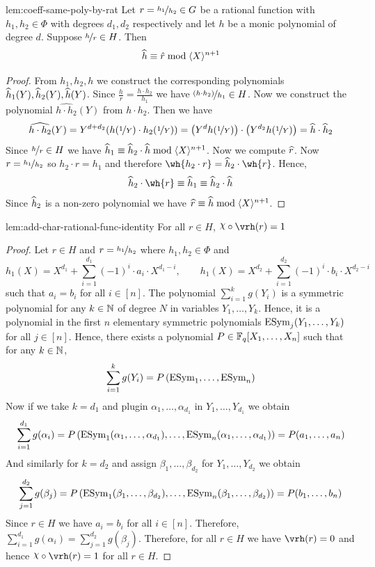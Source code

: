 \begin{lemma}{}{lem:coeff-same-poly-by-rat}
Let $r =\nicefrac{h_1}{h_2}\in G$ be a rational function with $h_1,h_2\in\Phi$ with degrees $d_1, d_2$ respectively and let $h$ be a monic polynomial of degree $d$.
Suppose $\nicefrac{h}{r}\in H$. Then
\[
\widehat{h} \equiv \hat{r} \bmod{\langle X\rangle^{n+1}}
\]
\end{lemma}
\begin{proof}
  From $h_1,h_2,h$ we construct the corresponding polynomials $\widehat{h}_1(Y),\widehat{h}_2(Y), \widehat{h}(Y)$. Since $\frac{h}{r}=\frac{h\cdot h_2}{h_1}$ we have $\nicefrac{(h\cdot h_2)}{h_1}\in H$. Now we construct the polynomial $\widehat{h\cdot h_2}(Y)$ from $h\cdot h_2$. Then we have $$\widehat{h\cdot h_2}(Y)=Y^{d+d_2}(h(\nicefrac1Y)\cdot h_2(\nicefrac1Y))=\left(Y^dh(\nicefrac1Y)\right)\cdot \left(Y^{d_2}h(\nicefrac1Y)\right)=\widehat{h}\cdot \widehat{h}_2$$Since $\nicefrac{h}{r}\in H$ we have $\widehat{h}_1\equiv \widehat{h}_2\cdot \widehat{h}\bmod{\langle X\rangle^{n+1}}$. 
  Now we compute $\widehat{r}$. Now $r=\nicefrac{h_1}{h_2}$ so $h_2\cdot r=h_1$ and therefore $\wh{h_2\cdot r}=\hh_2\cdot \wh{r}$. Hence, $$\hh_2\cdot \wh{r}\equiv \hh_1\equiv \hh_2\cdot \hh$$ Since $\widehat{h}_2$ is a non-zero polynomial we have $\widehat{r}\equiv \widehat{h}\bmod{\langle X\rangle^{n+1}}$. 
\end{proof}

\begin{lemma}{}{lem:add-char-rational-func-identity}
  For all $r\in H$, $\chi\circ\vrh(r)=1$
\end{lemma}
\begin{proof}
  Let $r\in H$ and $r=\nicefrac{h_1}{h_2}$ where $h_1,h_2\in\Phi$ and  $$h_1(X)=X^{d_1}+\sum_{i=1}^{d_1}(-1)^i\cdot a_i\cdot X^{d_1-i},\qquad h_1(X)=X^{d_2}+\sum_{i=1}^{d_2}(-1)^i\cdot b_i\cdot X^{d_2-i}$$ such that $a_i=b_i$ for all $i\in[n]$. The polynomial $\sum_{i=1}^k g(Y_i)$ is a symmetric polynomial for any $k\in\mathbb{N}$ of degree $N$ in variables $Y_1,\dots, Y_k$. Hence, it is a polynomial in the first $n$ elementary symmetric polynomials $\operatorname{ESym}_j(Y_1,\dots, Y_k)$ for all $j\in[n]$. Hence, there exists a polynomial $P\in \mathbb{F}_q[X_1,\dots,X_n]$ such that for any $k\in\mathbb{N}$, $$\sum_{i=1}^k g(Y_i)=P\left(\operatorname{ESym}_1,\dots, \operatorname{ESym}_n\right)$$Now if we take $k=d_1$ and plugin $\alpha_1,\dots, \alpha_{d_1}$ in $Y_1,\dots, Y_{d_1}$ we obtain $$\sum_{i=1}^{d_1}g(\alpha_i)=P\left(\operatorname{ESym}_1(\alpha_1,\dots,\alpha_{d_1}),\dots, \operatorname{ESym}_n(\alpha_1,\dots,\alpha_{d_1})\right)=P(a_1,\dots, a_n)$$And similarly for $k=d_2$ and assign $\beta_1,\dots, \beta_{d_2}$ for $Y_1,\dots, Y_{d_2}$  we obtain $$\sum_{j=1}^{d_2}g(\beta_j)=P\left(\operatorname{ESym}_1(\beta_1,\dots,\beta_{d_2}),\dots, \operatorname{ESym}_n(\beta_1,\dots,\beta_{d_2})\right)=P(b_1,\dots, b_n)$$Since $r\in H$ we have $a_i=b_i$ for all $i\in[n]$. Therefore, $\sum_{i=1}^{d_1}g(\alpha_i)=\sum_{j=1}^{d_2}g(\beta_j)$. Therefore, for all $r\in H$ we have $\vrh(r)=0$ and hence $\chi\circ \vrh(r)=1$ for all $r\in H$. 
\end{proof}

